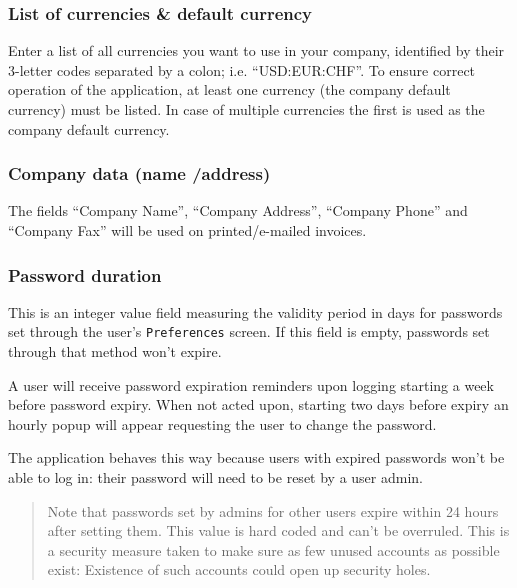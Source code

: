\subsubsection{List of currencies \& default currency}
\label{subsubsec-company-config-defaults-currencies}

Enter a list of all currencies you want
to use in your company, identified by their 3-letter codes separated by a colon; i.e.
``USD:EUR:CHF''. To ensure correct operation of the application, at least one currency
(the company default currency) must be listed. In case of multiple currencies the first
is used as the company default currency.

\subsubsection{Company data (name /address)}
\label{subsubsec-company-config-defaults-name-address}

The fields ``Company Name'', ``Company Address'',
``Company Phone'' and ``Company Fax'' will be used on printed/e-mailed invoices.

\subsubsection{Password duration}
\label{subsubsec-company-config-defaults-password-duration}

This is an integer value field measuring the validity period in days for passwords set through
the user's \texttt{Preferences} screen. If this field is empty, passwords set through that method
won't expire.

A user will receive password expiration reminders upon logging starting a week before password
expiry. When not acted upon, starting two days before expiry an hourly popup will appear
requesting the user to change the password.

The application behaves this way because users with expired passwords won't be able to log in:
their password will need to be reset by a user admin.

\begin{quotation}
Note that passwords set by admins for other users expire within 24 hours after setting them.
This value is hard coded and can't be overruled. This is a security measure taken to make
sure as few unused accounts as possible exist: Existence of such accounts could open up security
holes.
\end{quotation}


